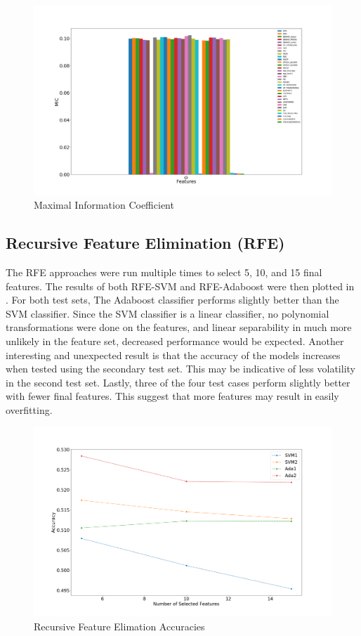 \documentclass{article}\raggedbottom
\begin{document}
\begin{figure}[H]
	\centering
	\includegraphics[width=\linewidth]{data/MICT1.png}
	\caption{Maximal Information Coefficient}
	\label{fig:MIC}
\end{figure}

\subsection{Recursive Feature Elimination (RFE)}
The RFE approaches were run multiple times to select 5, 10, and 15 final features. The results of both RFE-SVM and RFE-Adaboost were then plotted in . For both test sets, The Adaboost classifier performs slightly better than the SVM classifier. Since the SVM classifier is a linear classifier, no polynomial transformations were done on the features, and linear separability in much more unlikely in the feature set, decreased performance would be expected. Another interesting and unexpected result is that the accuracy of the models increases when tested using the secondary test set. This may be indicative of less volatility in the second test set. Lastly, three of the four test cases perform slightly better with fewer final features. This suggest that more features may result in easily overfitting.

\begin{figure}[H]
	\centering
	\includegraphics[width=\linewidth]{data/RFE_final.png}
	\caption{Recursive Feature Elimation Accuracies}
	\label{fig:RFE}
\end{figure}
\end{document}
